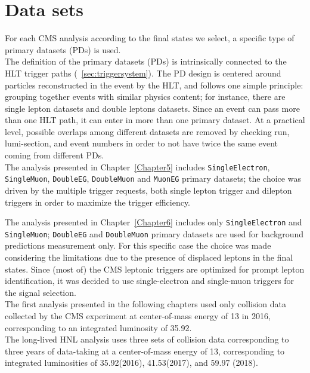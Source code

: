 \section{Data sets}\label{sec:c4data}

For each CMS analysis according to the final states we 
select, a specific type of primary datasets (PDs) is used.\\
The definition of the primary datasets (PDs) is intrinsically connected to
the HLT trigger paths (~\ref{sec:triggersystem}). The PD design is centered
around particles reconstructed in the event by the HLT, and follows one simple principle:
grouping together events with similar physics content; for instance, there are
single lepton datasets and double leptons datasets.
Since an event can pass more than one HLT path,
it can enter in more than one primary dataset. At a practical level, possible overlaps among different datasets are
removed by checking run, lumi-section, and event numbers in order to not have twice the same event coming from different PDs.\\


The analysis presented in Chapter~\ref{Chapter5} includes
\texttt{SingleElectron}, \texttt{SingleMuon}, \texttt{DoubleEG},
\texttt{DoubleMuon} and \texttt{MuonEG} primary datasets; the choice was driven by the
multiple trigger requests, both single lepton trigger and
dilepton triggers in order to maximize the trigger efficiency.

The analysis presented in Chapter~\ref{Chapter6} includes only
\texttt{SingleElectron} and \texttt{SingleMuon}; \texttt{DoubleEG} and
\texttt{DoubleMuon} primary datasets are used for background
predictions measurement only. For this specific case the choice was
made considering the limitations due to the presence of displaced
leptons in the final states.
Since (most of) the CMS leptonic triggers are
optimized for prompt lepton identification, it was decided
to use single-electron and single-muon triggers for the
signal selection.\\

The first analysis presented in the following chapters used only 
\Pp collision data collected
by the CMS experiment at center-of-mass energy of 13\TeV
in 2016, corresponding to an integrated luminosity of 35.92\fbinv.\\

The long-lived HNL analysis uses three sets of \Pp collision data
corresponding to three years of data-taking at a
center-of-mass energy of 13\TeV, corresponding to integrated
luminosities of 35.92\fbinv (2016), 41.53\fbinv (2017), and 59.97\fbinv
(2018). 


